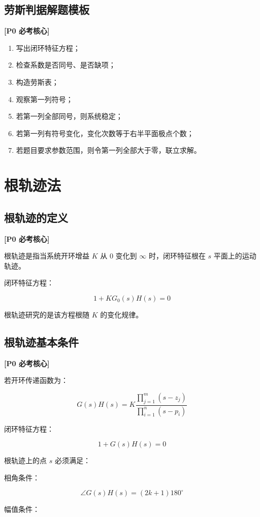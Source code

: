 \documentclass[UTF8,a4paper,12pt]{ctexart}
\newcommand{\Pzero}{\textcolor{p0}{\textbf{[P0 必考核心]}}}
\begin{document}
\subsection{劳斯判据解题模板}

\Pzero

\begin{enumerate}
    \item 写出闭环特征方程；
    \item 检查系数是否同号、是否缺项；
    \item 构造劳斯表；
    \item 观察第一列符号；
    \item 若第一列全部同号，则系统稳定；
    \item 若第一列有符号变化，变化次数等于右半平面极点个数；
    \item 若题目要求参数范围，则令第一列全部大于零，联立求解。
\end{enumerate}

\section{根轨迹法}

\subsection{根轨迹的定义}

\Pzero

根轨迹是指当系统开环增益 $K$ 从 $0$ 变化到 $\infty$ 时，闭环特征根在 $s$ 平面上的运动轨迹。

闭环特征方程：

\[
1+KG_0(s)H(s)=0
\]

根轨迹研究的是该方程根随 $K$ 的变化规律。

\subsection{根轨迹基本条件}

\Pzero

若开环传递函数为：

\[
G(s)H(s)=K\frac{\prod_{j=1}^{m}(s-z_j)}
{\prod_{i=1}^{n}(s-p_i)}
\]

闭环特征方程：

\[
1+G(s)H(s)=0
\]

根轨迹上的点 $s$ 必须满足：

相角条件：

\[
\angle G(s)H(s)=(2k+1)180^\circ
\]

幅值条件：
\end{document}
